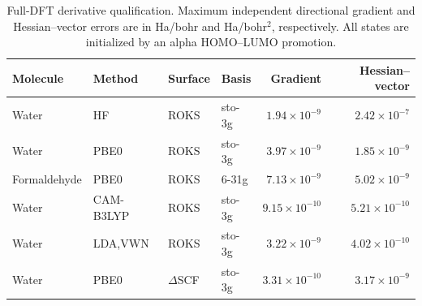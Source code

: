 \begin{table}[htbp]\centering\small
\caption{Full-DFT derivative qualification. Maximum independent directional gradient and Hessian--vector errors are in Ha/bohr and Ha/bohr$^2$, respectively. All states are initialized by an alpha HOMO--LUMO promotion.}\label{tab:dftresponse}
\begin{tabular}{llllrr}
\toprule
Molecule & Method & Surface & Basis & Gradient & Hessian--vector\\
\midrule
Water & HF & ROKS & sto-3g & $1.94\times10^{-9}$ & $2.42\times10^{-7}$\\
Water & PBE0 & ROKS & sto-3g & $3.97\times10^{-9}$ & $1.85\times10^{-9}$\\
Formaldehyde & PBE0 & ROKS & 6-31g & $7.13\times10^{-9}$ & $5.02\times10^{-9}$\\
Water & CAM-B3LYP & ROKS & sto-3g & $9.15\times10^{-10}$ & $5.21\times10^{-10}$\\
Water & LDA,VWN & ROKS & sto-3g & $3.22\times10^{-9}$ & $4.02\times10^{-10}$\\
Water & PBE0 & $\Delta$SCF & sto-3g & $3.31\times10^{-10}$ & $3.17\times10^{-9}$\\
\bottomrule
\end{tabular}
\end{table}
